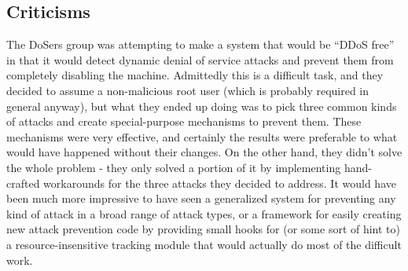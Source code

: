 \subsection{Criticisms}

The DoSers group was attempting to make a system that would be ``DDoS free'' in
that it would detect dynamic denial of service attacks and prevent them from
completely disabling the machine. Admittedly this is a difficult task, and they
decided to assume a non-malicious root user (which is probably required in
general anyway), but what they ended up doing was to pick three common kinds of
attacks and create special-purpose mechanisms to prevent them. These mechanisms
were very effective, and certainly the results were preferable to what would
have happened without their changes. On the other hand, they didn't solve the
whole problem - they only solved a portion of it by implementing hand-crafted
workarounds for the three attacks they decided to address. It would have been
much more impressive to have seen a generalized system for preventing any kind
of attack in a broad range of attack types, or a framework for easily creating
new attack prevention code by providing small hooks for (or some sort of hint
to) a resource-insensitive tracking module that would actually do most of the
difficult work.
